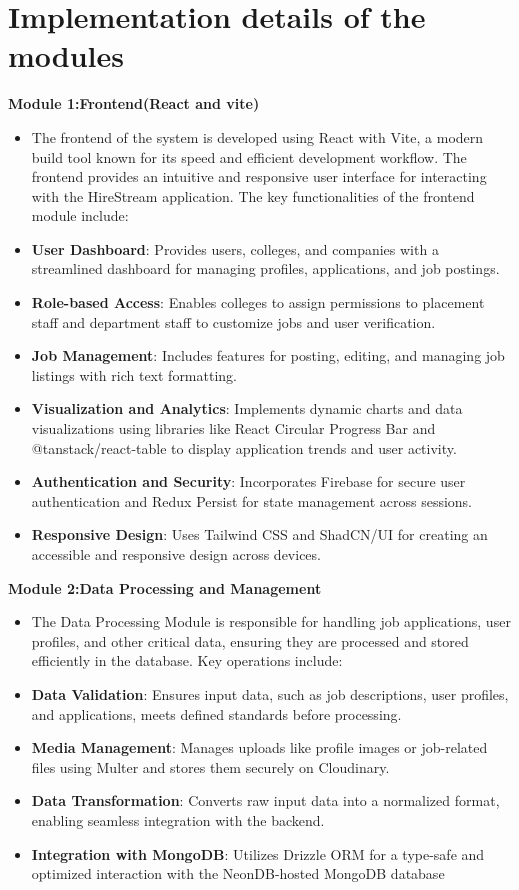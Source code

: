 \documentclass[a4paper, 12pt]{report}
\begin{document}
\section{Implementation details of the modules}
\noindent \textbf{Module 1:Frontend(React and vite)}
\begin{itemize}[itemsep=-4pt]
    \item The frontend of the system is developed using React with Vite, a modern build tool known for its speed and efficient development workflow. The frontend provides an intuitive and responsive user interface for interacting with the HireStream application. The key functionalities of the frontend module include:
    \item \textbf{User Dashboard}: Provides users, colleges, and companies with a streamlined dashboard for managing profiles, applications, and job postings.
    \item \textbf{Role-based Access}: Enables colleges to assign permissions to placement staff and department staff to customize jobs and user verification.
    \item \textbf{Job Management}: Includes features for posting, editing, and managing job listings with rich text formatting.
    \item \textbf{Visualization and Analytics}: Implements dynamic charts and data visualizations using libraries like React Circular Progress Bar and @tanstack/react-table to display application trends and user activity.
    \item \textbf{	Authentication and Security}: Incorporates Firebase for secure user authentication and Redux Persist for state management across sessions.
    \item \textbf{Responsive Design}: Uses Tailwind CSS and ShadCN/UI for creating an accessible and responsive design across devices.
\end{itemize}
\noindent \textbf{Module 2:Data Processing and Management}
\begin{itemize}[itemsep=-4pt]
    \item The Data Processing Module is responsible for handling job applications, user profiles, and other critical data, ensuring they are processed and stored efficiently in the database. Key operations include:
    \item \textbf{Data Validation}: Ensures input data, such as job descriptions, user profiles, and applications, meets defined standards before processing.
    \item \textbf{Media Management}: Manages uploads like profile images or job-related files using Multer and stores them securely on Cloudinary.
    \item 	\textbf{Data Transformation}: Converts raw input data into a normalized format, enabling seamless integration with the backend.
    \item \textbf{Integration with MongoDB}: Utilizes Drizzle ORM for a type-safe and optimized interaction with the NeonDB-hosted MongoDB database

\end{itemize}
\end{document}
